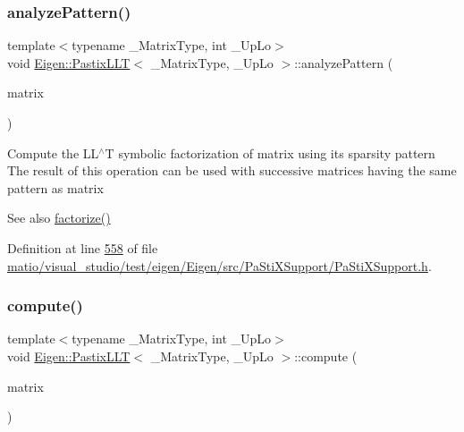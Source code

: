 \subsubsection{\texorpdfstring{analyze\+Pattern()}{analyzePattern()}\hspace{0.1cm}{\footnotesize\ttfamily [2/2]}}
{\footnotesize\ttfamily template$<$typename \+\_\+\+Matrix\+Type, int \+\_\+\+Up\+Lo$>$ \\
void \hyperlink{class_eigen_1_1_pastix_l_l_t}{Eigen\+::\+Pastix\+L\+LT}$<$ \+\_\+\+Matrix\+Type, \+\_\+\+Up\+Lo $>$\+::analyze\+Pattern (\begin{DoxyParamCaption}\item[{const Matrix\+Type \&}]{matrix }\end{DoxyParamCaption})\hspace{0.3cm}{\ttfamily [inline]}}

Compute the L\+L$^\wedge$T symbolic factorization of {\ttfamily matrix} using its sparsity pattern The result of this operation can be used with successive matrices having the same pattern as {\ttfamily matrix} \begin{DoxySeeAlso}{See also}
\hyperlink{class_eigen_1_1_pastix_l_l_t_a63dac317804b18a4704a519d7bdfaaff}{factorize()} 
\end{DoxySeeAlso}


Definition at line \hyperlink{matio_2visual__studio_2test_2eigen_2_eigen_2src_2_pa_sti_x_support_2_pa_sti_x_support_8h_source_l00558}{558} of file \hyperlink{matio_2visual__studio_2test_2eigen_2_eigen_2src_2_pa_sti_x_support_2_pa_sti_x_support_8h_source}{matio/visual\+\_\+studio/test/eigen/\+Eigen/src/\+Pa\+Sti\+X\+Support/\+Pa\+Sti\+X\+Support.\+h}.

\mbox{\label{class_eigen_1_1_pastix_l_l_t_a54fcdef53903851e2d8113a6ed330b5c}} 
\subsubsection{\texorpdfstring{compute()}{compute()}\hspace{0.1cm}{\footnotesize\ttfamily [1/2]}}
{\footnotesize\ttfamily template$<$typename \+\_\+\+Matrix\+Type, int \+\_\+\+Up\+Lo$>$ \\
void \hyperlink{class_eigen_1_1_pastix_l_l_t}{Eigen\+::\+Pastix\+L\+LT}$<$ \+\_\+\+Matrix\+Type, \+\_\+\+Up\+Lo $>$\+::compute (\begin{DoxyParamCaption}\item[{const Matrix\+Type \&}]{matrix }\end{DoxyParamCaption})\hspace{0.3cm}{\ttfamily [inline]}}

